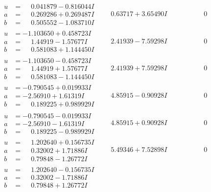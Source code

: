 \documentclass[1p]{elsarticle_modified}
\theoremstyle{definition}
\begin{document}
$$\begin{array}{c|c|c}
\begin{aligned}
u &= \phantom{-}0.041879 - 0.816044 I \\
a &= \phantom{-}0.269286 + 0.269487 I \\
b &= \phantom{-}0.505552 - 1.083710 I\end{aligned}
 & \phantom{-}0.63717 + 3.65490 I & \phantom{-0.000000 } 0 \\ \hline\begin{aligned}
u &= -1.103650 + 0.458723 I \\
a &= \phantom{-}1.44919 - 1.57677 I \\
b &= \phantom{-}0.581083 + 1.144450 I\end{aligned}
 & \phantom{-}2.41939 - 7.59298 I & \phantom{-0.000000 } 0 \\ \hline\begin{aligned}
u &= -1.103650 - 0.458723 I \\
a &= \phantom{-}1.44919 + 1.57677 I \\
b &= \phantom{-}0.581083 - 1.144450 I\end{aligned}
 & \phantom{-}2.41939 + 7.59298 I & \phantom{-0.000000 } 0 \\ \hline\begin{aligned}
u &= -0.790545 + 0.019933 I \\
a &= -2.56910 + 1.61319 I \\
b &= \phantom{-}0.189225 + 0.989929 I\end{aligned}
 & \phantom{-}4.85915 - 0.90928 I & \phantom{-0.000000 } 0 \\ \hline\begin{aligned}
u &= -0.790545 - 0.019933 I \\
a &= -2.56910 - 1.61319 I \\
b &= \phantom{-}0.189225 - 0.989929 I\end{aligned}
 & \phantom{-}4.85915 + 0.90928 I & \phantom{-0.000000 } 0 \\ \hline\begin{aligned}
u &= \phantom{-}1.202640 + 0.156735 I \\
a &= \phantom{-}0.32002 + 1.71886 I \\
b &= \phantom{-}0.79848 - 1.26772 I\end{aligned}
 & \phantom{-}5.49346 + 7.52898 I & \phantom{-0.000000 } 0 \\ \hline\begin{aligned}
u &= \phantom{-}1.202640 - 0.156735 I \\
a &= \phantom{-}0.32002 - 1.71886 I \\
b &= \phantom{-}0.79848 + 1.26772 I\end{aligned}

\end{array}$$
\end{document}
